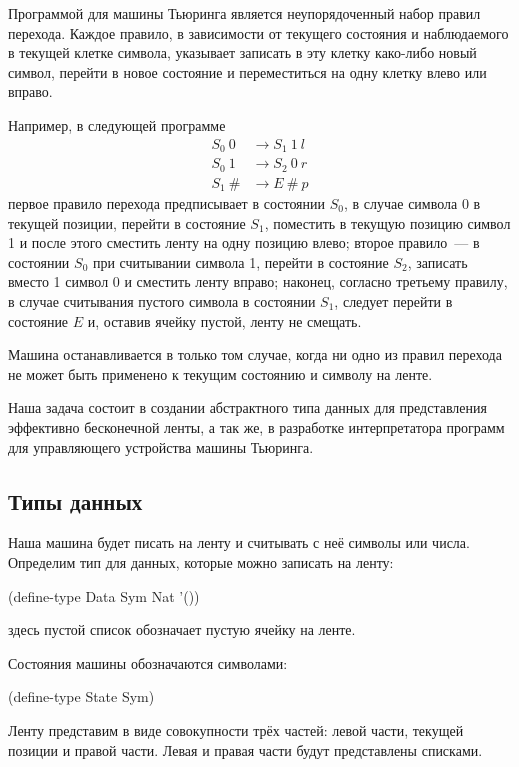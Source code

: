 Программой для машины Тьюринга является неупорядоченный набор правил перехода. Каждое правило, в зависимости от текущего состояния и наблюдаемого в текущей клетке символа, указывает записать в эту клетку како-либо новый символ, перейти в новое состояние и переместиться на одну клетку влево или вправо. 

Например, в следующей программе
\label{TM-prog}
\begin{align*}
S_0~0 &\to S_1~1~l\\
S_0~1 &\to S_2~0~r\\
S_1~\# &\to E~\#~p
\end{align*}
первое правило перехода предписывает в состоянии $S_0$, в случае символа 0 в текущей позиции, перейти в состояние $S_1$, поместить в текущую позицию символ 1 и после этого сместить ленту на одну позицию влево; второе правило~--- в состоянии $S_0$ при считывании символа 1, перейти в состояние $S_2$, записать вместо 1 символ 0 и сместить ленту вправо; наконец, согласно третьему правилу, в случае считывания пустого символа в состоянии $S_1$, следует перейти в состояние $E$ и, оставив ячейку пустой, ленту не смещать.

Машина останавливается в только том случае, когда ни одно из правил перехода не может быть применено к текущим состоянию и символу на ленте.

Наша задача состоит в создании абстрактного типа данных для представления эффективно бесконечной ленты, а так же, в разработке интерпретатора программ для управляющего устройства машины Тьюринга.


\subsection*{Типы данных}

Наша машина будет писать на ленту и считывать с неё символы или числа. Определим тип для данных, которые можно записать на ленту:
\begin{SchemeCode}
(define-type Data Sym Nat '())
\end{SchemeCode}
\noindent здесь пустой список обозначает пустую ячейку на ленте.

Состояния машины обозначаются символами:
\begin{SchemeCode}
(define-type State Sym)
\end{SchemeCode}

Ленту представим в виде совокупности трёх частей: левой части, текущей позиции и правой части. Левая и правая части будут представлены списками. 

